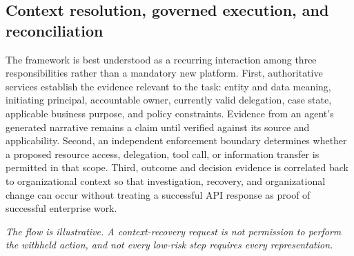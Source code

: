 \documentclass[11pt,letterpaper]{article}
\begin{document}
\subsection{Context resolution, governed execution, and reconciliation}
The framework is best understood as a recurring interaction among three responsibilities rather than a mandatory new platform. First, authoritative services establish the evidence relevant to the task: entity and data meaning, initiating principal, accountable owner, currently valid delegation, case state, applicable business purpose, and policy constraints. Evidence from an agent's generated narrative remains a claim until verified against its source and applicability. Second, an independent enforcement boundary determines whether a proposed resource access, delegation, tool call, or information transfer is permitted in that scope. Third, outcome and decision evidence is correlated back to organizational context so that investigation, recovery, and organizational change can occur without treating a successful API response as proof of successful enterprise work.

\begin{center}
\small
{}
\end{center}
\noindent\textit{The flow is illustrative. A context-recovery request is not permission to perform the withheld action, and not every low-risk step requires every representation.}
\end{document}
